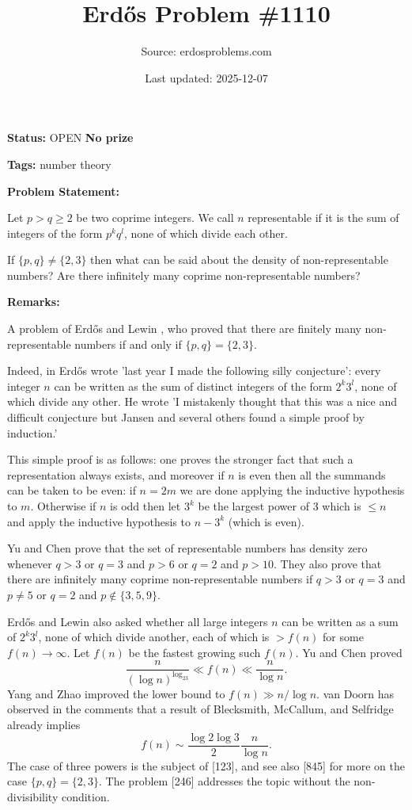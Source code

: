 \documentclass{article}
\title{Erd\H{o}s Problem \#1110}
\date{Last updated: 2025-12-07}
\author{Source: erdosproblems.com}
\begin{document}
\maketitle

\noindent\textbf{Status:} OPEN \quad \textbf{No prize}

\noindent\textbf{Tags:} number theory

\medskip
\noindent\textbf{Problem Statement:}

Let $p>q\geq 2$ be two coprime integers. We call $n$ representable if it is the sum of integers of the form $p^kq^l$, none of which divide each other. 

If $\{p,q\}\neq \{2,3\}$ then what can be said about the density of non-representable numbers? Are there infinitely many coprime non-representable numbers?

\bigskip
\noindent\textbf{Remarks:}

A problem of Erd\H{o}s and Lewin \cite{ErLe96}, who proved that there are finitely many non-representable numbers if and only if $\{p,q\}=\{2,3\}$.

Indeed, in \cite{Er92b} Erd\H{o}s wrote 'last year I made the following silly conjecture': every integer $n$ can be written as the sum of distinct integers of the form $2^k3^l$, none of which divide any other. He wrote 'I mistakenly thought that this was a nice and difficult conjecture but Jansen and several others found a simple proof by induction.' 

This simple proof is as follows: one proves the stronger fact that such a representation always exists, and moreover if $n$ is even then all the summands can be taken to be even: if $n=2m$ we are done applying the inductive hypothesis to $m$. Otherwise if $n$ is odd then let $3^k$ be the largest power of $3$ which is $\leq n$ and apply the inductive hypothesis to $n-3^k$ (which is even).

Yu and Chen \cite{YuCh22} prove that the set of representable numbers has density zero whenever $q>3$ or $q=3$ and $p>6$ or $q=2$ and $p>10$. They also prove that there are infinitely many coprime non-representable numbers if $q>3$ or $q=3$ and $p\neq 5$ or $q=2$ and $p\not\in \{3,5,9\}$.

Erd\H{o}s and Lewin \cite{ErLe96} also asked whether all large integers $n$ can be written as a sum of $2^k3^l$, none of which divide another, each of which is $>f(n)$ for some $f(n)\to \infty$. Let $f(n)$ be the fastest growing such $f(n)$. Yu and Chen \cite{YuCh22} proved\[\frac{n}{(\log n)^{\log_23}}\ll f(n) \ll \frac{n}{\log n}.\]Yang and Zhao \cite{YaZh25} improved the lower bound to $f(n)\gg n/\log n$. van Doorn has observed in the comments that a result of Blecksmith, McCallum, and Selfridge \cite{BMS98} already implies\[f(n)\sim \frac{\log 2\log 3}{2}\frac{n}{\log n}.\]The case of three powers is the subject of [123], and see also [845] for more on the case $\{p,q\}=\{2,3\}$. The problem [246] addresses the topic without the non-divisibility condition.
\end{document}
